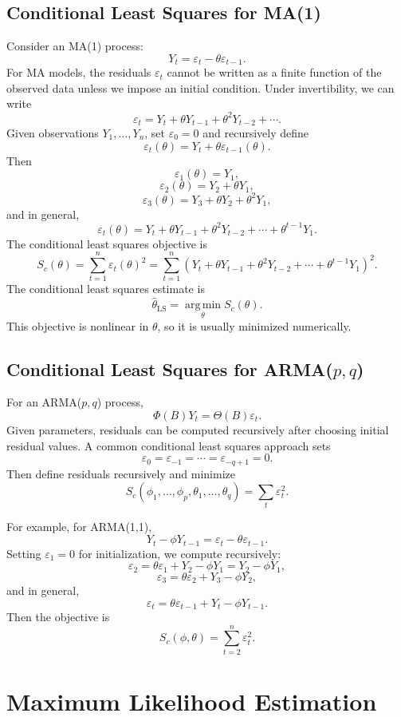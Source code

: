 \documentclass[12pt,oneside]{book}
\numberwithin{equation}{section}
\theoremstyle{definition}
\theoremstyle{plain}
\theoremstyle{remark}
\newcommand{\argmin}{\operatorname*{arg\,min}}
\begin{document}
\subsection{Conditional Least Squares for MA(1)}

Consider an MA(1) process:
\[
Y_t=\varepsilon_t-\theta\varepsilon_{t-1}.
\]
For MA models, the residuals $\varepsilon_t$ cannot be written as a finite function of the observed data unless we impose an initial condition. Under invertibility, we can write
\[
\varepsilon_t
=
Y_t+\theta Y_{t-1}+\theta^2Y_{t-2}+\cdots.
\]
Given observations $Y_1,\ldots,Y_n$, set $\varepsilon_0=0$ and recursively define
\[
\varepsilon_t(\theta)
=
Y_t+\theta\varepsilon_{t-1}(\theta).
\]
Then
\[
\varepsilon_1(\theta)=Y_1,
\]
\[
\varepsilon_2(\theta)=Y_2+\theta Y_1,
\]
\[
\varepsilon_3(\theta)=Y_3+\theta Y_2+\theta^2Y_1,
\]
and in general,
\[
\varepsilon_t(\theta)
=
Y_t+\theta Y_{t-1}+\theta^2Y_{t-2}+\cdots+\theta^{t-1}Y_1.
\]
The conditional least squares objective is
\[
S_c(\theta)
=
\sum_{t=1}^n
\varepsilon_t(\theta)^2
=
\sum_{t=1}^n
\left(
Y_t+\theta Y_{t-1}+\theta^2Y_{t-2}+\cdots+\theta^{t-1}Y_1
\right)^2.
\]
The conditional least squares estimate is
\[
\widehat{\theta}_{\mathrm{LS}}
=
\argmin_\theta S_c(\theta).
\]
This objective is nonlinear in $\theta$, so it is usually minimized numerically.

\subsection{Conditional Least Squares for ARMA($p,q$)}

For an ARMA($p,q$) process,
\[
\Phi(B)Y_t=\Theta(B)\varepsilon_t.
\]
Given parameters, residuals can be computed recursively after choosing initial residual values. A common conditional least squares approach sets
\[
\varepsilon_0=\varepsilon_{-1}=\cdots=\varepsilon_{-q+1}=0.
\]
Then define residuals recursively and minimize
\[
S_c(\phi_1,\ldots,\phi_p,\theta_1,\ldots,\theta_q)
=
\sum_t \varepsilon_t^2.
\]

For example, for ARMA(1,1),
\[
Y_t-\phi Y_{t-1}=\varepsilon_t-\theta\varepsilon_{t-1}.
\]
Setting $\varepsilon_1=0$ for initialization, we compute recursively:
\[
\varepsilon_2
=
\theta\varepsilon_1+Y_2-\phi Y_1
=
Y_2-\phi Y_1,
\]
\[
\varepsilon_3
=
\theta\varepsilon_2+Y_3-\phi Y_2,
\]
and in general,
\[
\varepsilon_t
=
\theta\varepsilon_{t-1}+Y_t-\phi Y_{t-1}.
\]
Then the objective is
\[
S_c(\phi,\theta)
=
\sum_{t=2}^n \varepsilon_t^2.
\]

\section{Maximum Likelihood Estimation}
\end{document}
